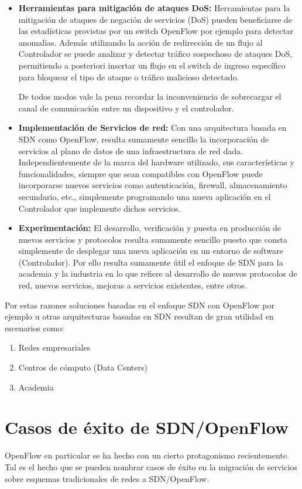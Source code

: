 \begin{itemize}
\item \textbf{Herramientas para mitigación de ataques DoS:}
Herramientas para la mitigación de ataques de negación de servicios (DoS) pueden beneficiarse de las estadísticas provistas por un switch OpenFlow por ejemplo para detectar anomalías. Además utilizando la acción de redirección de un flujo al Controlador se puede analizar y detectar tráfico sospechoso de ataques DoS, permitiendo a posteriori insertar un flujo en el switch de ingreso específico para bloquear el tipo de ataque o tráfico malicioso detectado. 

De todos modos vale la pena recordar la inconveniencia de sobrecargar el canal de comunicaci\'on entre un dispositivo y el controlador. 

\item \textbf{Implementaci\'on de Servicios de red:}
Con una arquitectura basada en SDN como OpenFlow, resulta sumamente sencillo la incorporación de servicios al plano de datos de una infraestructura de red dada. Independientemente de la marca del hardware utilizado, sus características y funcionalidades, siempre que sean compatibles con OpenFlow puede incorporarse nuevos servicios como autenticación, firewall, almacenamiento secundario, etc., simplemente programando una nueva aplicación en el Controlador que implemente dichos servicios.

\item \textbf{Experimentación:}
El desarrollo, verificación y puesta en producción de nuevos servicios y protocolos resulta sumamente sencillo puesto que consta simplemente de desplegar una nueva aplicación en un entorno de software 
 (Controlador). Por ello resulta sumamente útil el enfoque de SDN para la academia y la industria en lo que refiere al desarrollo de nuevos protocolos de red, nuevos servicios, mejoras a servicios existentes, entre otros.

\end{itemize}

Por estas razones soluciones basadas en el enfoque SDN con OpenFlow por ejemplo u otras arquitecturas basadas en SDN resultan de gran utilidad en escenarios como:

\begin{enumerate}
\item Redes empresariales
\item Centros de cómputo (Data Centers)
\item Academia
\end{enumerate}

\section{Casos de éxito de SDN/OpenFlow}
OpenFlow en particular se ha hecho con un cierto protagonismo recientemente. Tal es el hecho que se pueden nombrar casos de éxito en la migración de servicios sobre esquemas tradicionales de redes a SDN/OpenFlow.\\

